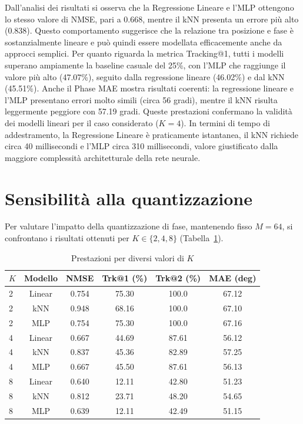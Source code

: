 \documentclass[12pt,a4paper]{report}
\begin{document}
\newpage
Dall'analisi dei risultati si osserva che la Regressione Lineare e
l'MLP ottengono lo stesso valore di NMSE, pari a 0.668, mentre il kNN
presenta un errore più alto (0.838). Questo comportamento suggerisce
che la relazione tra posizione e fase è sostanzialmente lineare e può
quindi essere modellata efficacemente anche da approcci semplici. Per
quanto riguarda la metrica Tracking@1, tutti i modelli superano
ampiamente la baseline casuale del 25\%, con l'MLP che raggiunge il
valore più alto (47.07\%), seguito dalla regressione lineare
(46.02\%) e dal kNN (45.51\%). Anche il Phase MAE mostra risultati
coerenti: la regressione lineare e l'MLP presentano errori molto
simili (circa 56 gradi), mentre il kNN risulta leggermente peggiore
con 57.19 gradi. Queste prestazioni confermano la validità dei
modelli lineari per il caso considerato ($K=4$). In termini di tempo
di addestramento, la Regressione Lineare è praticamente istantanea,
il kNN richiede circa 40 millisecondi e l'MLP circa 310 millisecondi,
valore giustificato dalla maggiore complessità architetturale della
rete neurale.

\section{Sensibilità alla quantizzazione}
Per valutare l'impatto della quantizzazione di fase, mantenendo fisso
$M=64$, si confrontano i risultati ottenuti per $K\in\{2,4,8\}$
(Tabella~\ref{tab:results_by_k}).

\begin{table}[ht]
  \centering
  \caption{Prestazioni per diversi valori di $K$}
  \label{tab:results_by_k}
  \begin{tabular}{lccccc}
    \hline
    \textbf{$K$} & \textbf{Modello} & \textbf{NMSE} & \textbf{Trk@1
    (\%)} & \textbf{Trk@2 (\%)} & \textbf{MAE (deg)} \\
    \hline
    2 & Linear & 0.754 & 75.30 & 100.0 & 67.12 \\
    2 & kNN    & 0.948 & 68.16 & 100.0 & 67.10 \\
    2 & MLP    & 0.754 & 75.30 & 100.0 & 67.16 \\
    \hline
    4 & Linear & 0.667 & 44.69 & 87.61 & 56.12 \\
    4 & kNN    & 0.837 & 45.36 & 82.89 & 57.25 \\
    4 & MLP    & 0.667 & 45.50 & 87.61 & 56.13 \\
    \hline
    8 & Linear & 0.640 & 12.11 & 42.80 & 51.23 \\
    8 & kNN    & 0.812 & 23.71 & 48.20 & 54.65 \\
    8 & MLP    & 0.639 & 12.11 & 42.49 & 51.15 \\
    \hline
  \end{tabular}
\end{table}
\end{document}
